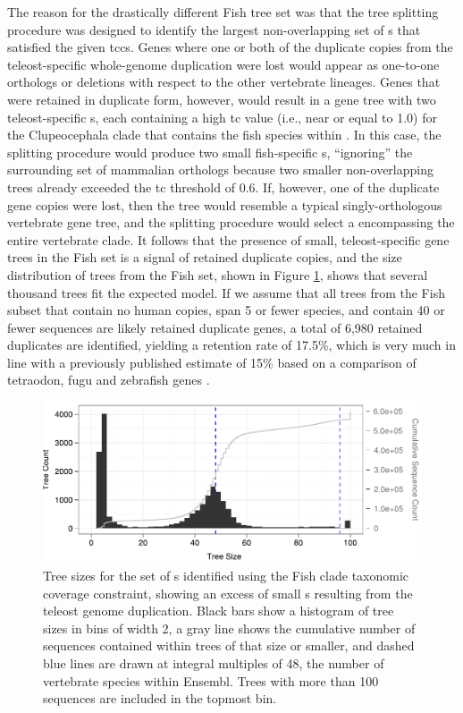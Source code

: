 The reason for the drastically different Fish tree set was that the
tree splitting procedure was designed to identify the largest
non-overlapping set of \subtr{}s that satisfied the given
\acp{tcc}. Genes where one or both of the duplicate copies from the
teleost-specific whole-genome duplication were lost would appear as
one-to-one orthologs or deletions with respect to the other vertebrate
lineages. Genes that were retained in duplicate form, however, would
result in a gene tree with two teleost-specific \subtr{}s, each
containing a high \ac{tc} value (i.e., near or equal to 1.0) for the
Clupeocephala clade that contains the fish species within \ens. In
this case, the splitting procedure would produce two small
fish-specific \subtr{}s, ``ignoring'' the surrounding set of mammalian
orthologs because two smaller non-overlapping trees already exceeded
the \ac{tc} threshold of 0.6. If, however, one of the duplicate gene
copies were lost, then the tree would resemble a typical
singly-orthologous vertebrate gene tree, and the splitting procedure
would select a \subtr encompassing the entire vertebrate clade. It
follows that the presence of small, teleost-specific gene trees in the
Fish set is a signal of retained duplicate copies, and the size
distribution of trees from the Fish set, shown in Figure
\ref{ensembl_fish_hist}, shows that several thousand trees fit the
expected model. If we assume that all trees from the Fish subset that
contain no human copies, span 5 or fewer species, and contain 40 or
fewer sequences are likely retained duplicate genes, a total of 6,980
retained duplicates are identified, yielding a retention rate of
17.5\%, which is very much in line with a previously published
estimate of 15\% based on a comparison of tetraodon, fugu and
zebrafish genes \citep{Brunet2006}.

\begin{figure}
\centering
\includegraphics[scale=0.9]{Figs/hist_fish_roots.pdf}
\caption{Tree sizes for the set of \subtr{}s identified using the Fish
  clade taxonomic coverage constraint, showing an excess of small
  \subtr{}s resulting from the teleost genome duplication. Black bars
  show a histogram of tree sizes in bins of width 2, a gray line shows
  the cumulative number of sequences contained within trees of that
  size or smaller, and dashed blue lines are drawn at integral
  multiples of 48, the number of vertebrate species within
  Ensembl. Trees with more than 100 sequences are included in the
  topmost bin.}
\label{ensembl_fish_hist}
\end{figure}

